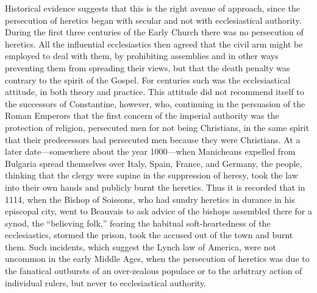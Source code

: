 \documentclass{book}
\begin{document}
Historical evidence suggests that this is the right avenue of approach, since the persecution of heretics began with secular and not with ecclesiastical authority. During the first three centuries of the Early Church there was no persecution of heretics. All the influential ecclesiastics then agreed that the civil arm might be employed to deal with them, by prohibiting assemblies and in other ways preventing them from spreading their views, but that the death penalty was contrary to the spirit of the Gospel. For centuries such was the ecclesiastical attitude, in both theory and practice. This attitude did not recommend itself to the successors of Constantine, however, who, continuing in the persuasion of the Roman Emperors that the first concern of the imperial authority was the protection of religion, persecuted men for not being Christians, in the same spirit that their predecessors had persecuted men because they were Christians. At a later date—somewhere about the year 1000—when Manicheans expelled from Bulgaria spread themselves over Italy, Spain, France, and Germany, the people, thinking that the clergy were supine in the suppression of heresy, took the law into their own hands and publicly burnt the heretics. Thus it is recorded that in 1114, when the Bishop of Soissons, who had sundry heretics in durance in his episcopal city, went to Beauvais to ask advice of the bishops assembled there for a synod, the “believing folk,” fearing the habitual soft-heartedness of the ecclesiastics, stormed the prison, took the accused out of the town and burnt them. Such incidents, which suggest the Lynch law of America, were not uncommon in the early Middle Ages, when the persecution of heretics was due to the fanatical outbursts of an over-zealous populace or to the arbitrary action of individual rulers, but never to ecclesiastical authority.
\end{document}
